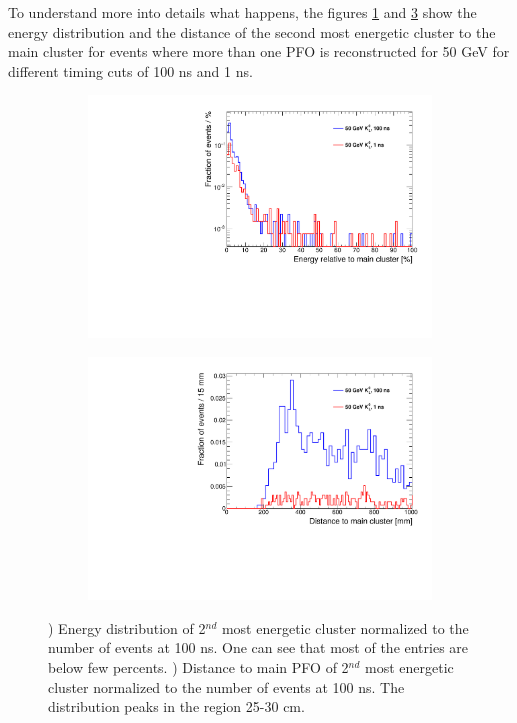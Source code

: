 To understand more into details what happens, the figures \ref{fig:Energy2ndCluster} and \ref{fig:Distance2ndCluster} show the energy distribution and the distance of the second most energetic cluster to the main cluster for events where more than one PFO is reconstructed for 50 GeV \kzeroL{} for different timing cuts of 100 ns and 1 ns.

\begin{figure}[htbp!]
  \centering
  \begin{subfigure}[t]{0.49\textwidth}
    \centering
    \includegraphics[width=1\linewidth]{../Thesis_Plots/ILD/AdditionalPlots/Plots/Energy2ndCluster_100ns_50GeV}
    \caption{} \label{fig:Energy2ndCluster}
  \end{subfigure}
  \hfill
  \begin{subfigure}[t]{0.49\textwidth}
    \centering
    \includegraphics[width=1\linewidth]{../Thesis_Plots/ILD/AdditionalPlots/Plots/Distance2ndCluster_100ns_50GeV}
    \caption{} \label{fig:Distance2ndCluster}
  \end{subfigure}
  \caption{) Energy distribution of 2$^{nd}$ most energetic cluster normalized to the number of events at 100 ns. One can see that most of the entries are below few percents. ) Distance to main PFO of 2$^{nd}$ most energetic cluster normalized to the number of events at 100 ns. The distribution peaks in the region 25-30 cm.}
\end{figure}


